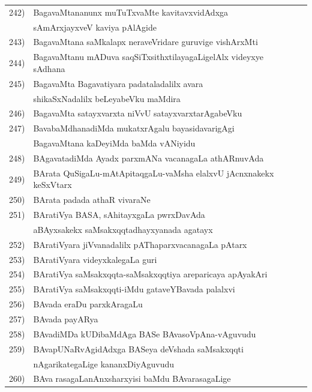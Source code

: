 \begin{longtable}{@{}cp{7.4cm}r}
242) & BagavaMtananunx muTuTxvaMte kavitavxvidAdxga & \\
     & sAmArxjayxveV kaviya pAlAgide & \pageref{page183a}\\
243) & BagavaMtana saMkalapx neraveVridare guruvige vishArxMti & \pageref{page71}\\
244) & BagavaMtanu mADuva saqSiTxsithxtilayagaLigelAlx videyxye sAdhana & \pageref{page101a}\\
245) & BagavaMta Bagavatiyara padataladalilx avara & \\
     & shikaSxNadalilx beLeyabeVku maMdira & \pageref{page67a}\\
246) & BagavaMta satayxvarxta niVvU satayxvarxtarAgabeVku & \pageref{page79a}\\ 
247) & BavabaMdhanadiMda mukatxrAgalu bayasidavarigAgi & \\
     & BagavaMtana kaDeyiMda baMda vANiyidu & \pageref{page251}   \\
248) & BAgavatadiMda Ayadx parxmANa vacanagaLa athARnuvAda & \pageref{page164a}\\
249) & BArata QuSigaLu-mAtApitaqgaLu-vaMsha elalxvU jAcnxnakekx keSxVtarx & \pageref{page104a}\\ 
250) & BArata padada athaR vivaraNe & \pageref{20}\\
251) & BAratiVya BASA, sAhitayxgaLa pwrxDavAda & \\
     & aBAyxsakekx saMsakxqqtadhayxyanada agatayx & \pageref{page37}\\
252) & BAratiVyara jiVvanadalilx pAThaparxvacanagaLa pAtarx & \pageref{page105}\\
253) & BAratiVyara videyxkalegaLa guri & \pageref{page22}\\
254) & BAratiVya saMsakxqqta-saMsakxqqtiya areparicaya apAyakAri & \pageref{page30}\\
255) & BAratiVya saMsakxqqti-iMdu gataveYBavada palalxvi & \pageref{page23a}\\
256) & BAvada eraDu parxkAragaLu & \pageref{page230a}\\
257) & BAvada payARya & \pageref{page230}\\
258) & BAvadiMDa kUDibaMdAga BASe BAvasoVpAna-vAguvudu & \pageref{page26}\\
259) & BAvapUNaRvAgidAdxga BASeya deVshada saMsakxqqti & \\
     & nAgarikategaLige kananxDiyAguvudu & \pageref{page16a}\\
260) & BAva rasagaLanAnxsharxyisi baMdu BAvarasagaLige & \\

\end{longtable}
